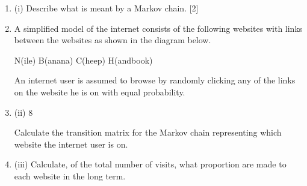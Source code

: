 \documentclass[a4paper,12pt]{article}
\begin{document}
\begin{enumerate}

\item (i)
Describe what is meant by a Markov chain.
[2]
\item A simplified model of the internet consists of the following websites with links between the websites as shown in the diagram below.

N(ile) B(anana)
C(heep) H(andbook)

An internet user is assumed to browse by randomly clicking any of the links on the website he is on with equal probability.
\item 
(ii)
8

Calculate the transition matrix for the Markov chain representing which
website the internet user is on.
\item 
(iii) Calculate, of the total number of visits, what proportion are made to each
website in the long term.
\end{enumerate}
\end{document}
